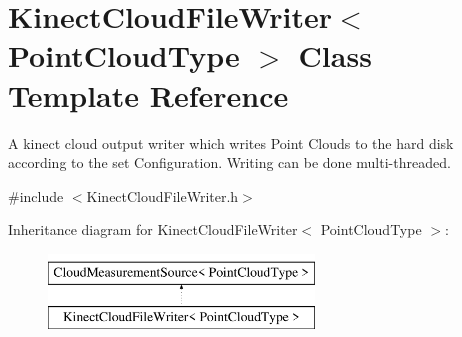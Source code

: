 \hypertarget{class_kinect_cloud_file_writer}{}\section{Kinect\+Cloud\+File\+Writer$<$ Point\+Cloud\+Type $>$ Class Template Reference}
\label{class_kinect_cloud_file_writer}


A kinect cloud output writer which writes Point Clouds to the hard disk according to the set Configuration. Writing can be done multi-\/threaded.  




{\ttfamily \#include $<$Kinect\+Cloud\+File\+Writer.\+h$>$}

Inheritance diagram for Kinect\+Cloud\+File\+Writer$<$ Point\+Cloud\+Type $>$\+:\begin{figure}[H]
\begin{center}
\leavevmode
\includegraphics[height=2.000000cm]{class_kinect_cloud_file_writer}
\end{center}
\end{figure}
